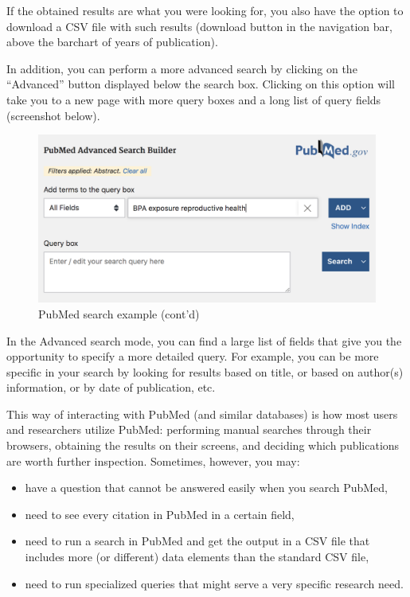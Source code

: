 \documentclass[
]{book}
\begin{document}
If the obtained results are what you were looking for, you also have the option
to download a CSV file with such results (download button in the navigation bar,
above the barchart of years of publication).

In addition, you can perform a more advanced search by clicking on the
``Advanced'' button displayed below the search box. Clicking on this option
will take you to a new page with more query boxes and a long list of query
fields (screenshot below).

\begin{figure}

{\centering \includegraphics[width=0.7\linewidth]{images/api/pubmed-search3} 

}

\caption{PubMed search example (cont'd)}\label{fig:unnamed-chunk-133}
\end{figure}

In the Advanced search mode, you can find a large list of fields that give you
the opportunity to specify a more detailed query. For example, you can be more
specific in your search by looking for results based on title, or based on
author(s) information, or by date of publication, etc.

This way of interacting with PubMed (and similar databases) is how most
users and researchers utilize PubMed: performing manual searches through their
browsers, obtaining the results on their screens, and deciding which
publications are worth further inspection. Sometimes, however, you may:

\begin{itemize}
\item
  have a question that cannot be answered easily when you search PubMed,
\item
  need to see every citation in PubMed in a certain field,
\item
  need to run a search in PubMed and get the output in a CSV file that
  includes more (or different) data elements than the standard CSV file,
\item
  need to run specialized queries that might serve a very specific research
  need.
\end{itemize}
\end{document}
